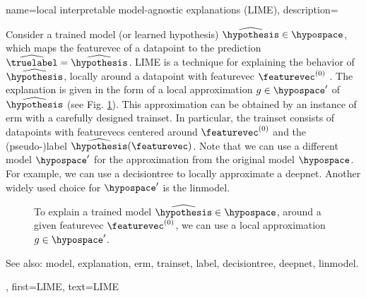 {name={local interpretable model-agnostic explanations (LIME)},
	description={Consider 
		a trained \gls{model} (or learned \gls{hypothesis}) $\widehat{\hypothesis} \in \hypospace$, 
		which maps the \gls{featurevec} of a \gls{datapoint} to the \gls{prediction} $\widehat{\truelabel}= \widehat{\hypothesis}$. 
		LIME is a technique for explaining the behavior of $\widehat{\hypothesis}$, locally around a \gls{datapoint} with \gls{featurevec} $\featurevec^{(0)}$ \cite{Ribeiro2016}. 
		The \gls{explanation} is given in the form of a local approximation $g \in \hypospace'$ of $\widehat{\hypothesis}$ 
		(see Fig. \ref{fig_lime_dict}). This approximation can be obtained by an instance of \gls{erm} 
		with a carefully designed \gls{trainset}. In particular, the \gls{trainset} consists of \glspl{datapoint} with 
		\glspl{featurevec} centered around $\featurevec^{(0)}$ and the (pseudo-)\gls{label} $\widehat{\hypothesis}(\featurevec)$. 
		Note that we can use a different \gls{model} $\hypospace'$ for the approximation from 
		the original \gls{model} $\hypospace$. For example, we can use a \gls{decisiontree} 
		to locally approximate a \gls{deepnet}. Another widely used choice for $\hypospace'$ is 
		the \gls{linmodel}. 
		\begin{figure}[H]
		\begin{center}
		\end{center}
		\caption{To explain a trained \gls{model} $\widehat{\hypothesis} \in \hypospace$, around a 
		given \gls{featurevec} $\featurevec^{(0)}$, we can use a local approximation $g \in \hypospace'$. }
		\label{fig_lime_dict}
		\end{figure}
		See also: \gls{model}, \gls{explanation}, \gls{erm}, \gls{trainset}, \gls{label}, \gls{decisiontree}, \gls{deepnet}, \gls{linmodel}.},
	first={LIME},
	text={LIME}
}



